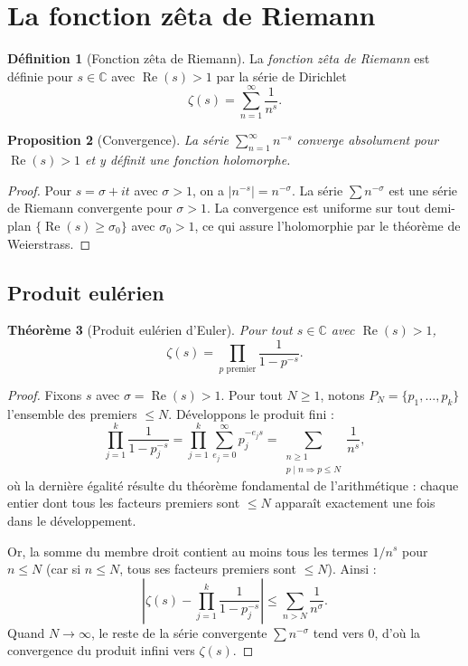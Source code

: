 \documentclass[12pt,a4paper,openany]{book}
\theoremstyle{definition}
\newtheorem{definition}{Définition}[chapter]
\theoremstyle{plain}
\newtheorem{theoreme}[definition]{Théorème}
\newtheorem{proposition}[definition]{Proposition}
\theoremstyle{remark}
\newcommand{\C}{\mathbb{C}}
\newcommand{\abs}[1]{\left|#1\right|}
\begin{document}
\section{La fonction zêta de Riemann}
\label{sec:zeta}

\begin{definition}[Fonction zêta de Riemann]
\label{def:zeta}
La \emph{fonction zêta de Riemann} est définie pour
$s \in \C$ avec $\operatorname{Re}(s) > 1$ par la série de Dirichlet
\[
  \zeta(s) = \sum_{n=1}^{\infty} \frac{1}{n^s}.
\]
\end{definition}

\begin{proposition}[Convergence]
\label{prop:convergence-zeta}
La série $\sum_{n=1}^{\infty} n^{-s}$ converge absolument pour
$\operatorname{Re}(s) > 1$ et y définit une fonction holomorphe.
\end{proposition}

\begin{proof}
Pour $s = \sigma + it$ avec $\sigma > 1$, on a $\abs{n^{-s}} = n^{-\sigma}$.
La série $\sum n^{-\sigma}$ est une série de Riemann convergente pour $\sigma > 1$.
La convergence est uniforme sur tout demi-plan $\{\operatorname{Re}(s) \geq \sigma_0\}$
avec $\sigma_0 > 1$, ce qui assure l'holomorphie par le théorème de Weierstrass.
\end{proof}

\subsection{Produit eulérien}
\label{subsec:euler-product}

\begin{theoreme}[Produit eulérien d'Euler]
\label{thm:euler-product}
Pour tout $s \in \C$ avec $\operatorname{Re}(s) > 1$,
\[
  \zeta(s) = \prod_{p \text{ premier}} \frac{1}{1 - p^{-s}}.
\]
\end{theoreme}

\begin{proof}
Fixons $s$ avec $\sigma = \operatorname{Re}(s) > 1$. Pour tout $N \geq 1$, notons
$P_N = \{p_1, \ldots, p_k\}$ l'ensemble des premiers $\leq N$. Développons le
produit fini :
\[
  \prod_{j=1}^{k} \frac{1}{1 - p_j^{-s}}
  = \prod_{j=1}^{k} \sum_{e_j=0}^{\infty} p_j^{-e_j s}
  = \sum_{\substack{n \geq 1 \\ p \mid n \Rightarrow p \leq N}} \frac{1}{n^s},
\]
où la dernière égalité résulte du théorème fondamental de l'arithmétique :
chaque entier dont tous les facteurs premiers sont $\leq N$ apparaît exactement
une fois dans le développement.

Or, la somme du membre droit contient au moins tous les termes $1/n^s$ pour
$n \leq N$ (car si $n \leq N$, tous ses facteurs premiers sont $\leq N$). Ainsi :
\[
  \left| \zeta(s) - \prod_{j=1}^{k} \frac{1}{1 - p_j^{-s}} \right|
  \leq \sum_{n > N} \frac{1}{n^\sigma}.
\]
Quand $N \to \infty$, le reste de la série convergente $\sum n^{-\sigma}$ tend
vers $0$, d'où la convergence du produit infini vers $\zeta(s)$.
\end{proof}
\end{document}
